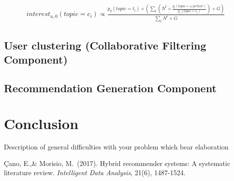 \documentclass{article}
\begin{document}
\begin{equation}
\begin{aligned}
interest_{u,0}(topic = c_i) \propto \displaystyle\frac{p_0(topic = t_i) \times \left(\sum_{t} \left(N^t \times \displaystyle\frac{p_t(topic = c_i| article)}{p_t(topic = c_i)}\right) + G\right)}{\sum_{t} N^t + G }
\end{aligned}
\end{equation}


\subsection{User clustering (Collaborative Filtering Component)}

\subsection{Recommendation Generation Component}

\section{Conclusion}

{Description of general difficulties with your problem which bear elaboration
}

\begin{thebibliography}{9}

 Çano, E.,\& Morisio, M.\ (2017). Hybrid recommender systems: A systematic literature review. {\it Intelligent Data Analysis}, 21(6), 1487-1524.
\end{thebibliography}
\end{document}

